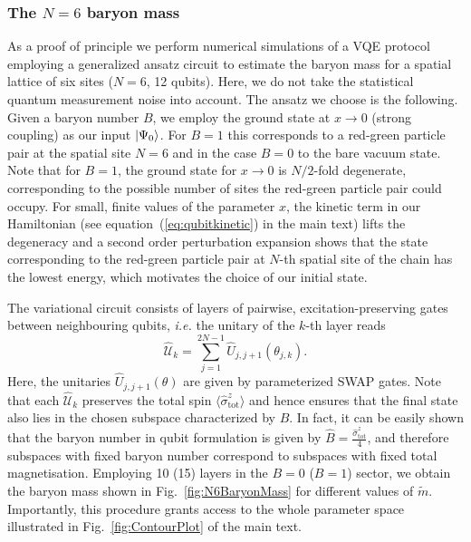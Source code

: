 \documentclass[twocolumn,aps,showpacs,prb,superscriptaddress,floatfix,10pt,nofootinbib]{revtex4-2}
\renewcommand{\eqref}[1]{equation~(\ref{#1})}
\begin{document}
\subsubsection{The \texorpdfstring{$N=6$}{N=6} baryon mass}
As a proof of principle we perform numerical simulations of a VQE protocol employing a generalized ansatz circuit to estimate the baryon mass for a spatial lattice of six sites ($N=6$, 12 qubits). Here, we do not take the statistical quantum measurement noise into account.
The ansatz we choose is the following. Given a baryon number $B$, we employ the ground state at $x\to0$ (strong coupling) as our input $\ket{\Psi_0}$. For $B=1$ this corresponds to a red-green particle pair at the spatial site $N=6$ and in the case $B=0$ to the bare vacuum state. 
Note that for $B=1$, the ground state for $x\to0$ is $N/2$-fold degenerate, corresponding to the possible number of sites the red-green particle pair could occupy. For small, finite values of the parameter $x$, the kinetic term in our Hamiltonian (see \eqref{eq:qubitkinetic} in the main text) lifts the degeneracy and a second order perturbation expansion shows that the state corresponding to the red-green particle pair at $N$-th spatial site of the chain has the lowest energy, which motivates the choice of our initial state. 

The variational circuit consists of layers of pairwise, excitation-preserving gates between neighbouring qubits, \textit{i.e.} the unitary of the $k$-th layer reads
\begin{equation}
\hat{\mathcal{U}}_k = \sum_{j=1}^{2N-1} \hat{U}_{j,j+1}(\theta_{j,k}).
\label{eq:N6VQEansatz}
\end{equation}
Here, the unitaries $\hat{U}_{j,j+1}(\theta)$ are given by parameterized SWAP gates.
Note that each $\hat{\mathcal{U}}_k$ preserves the total spin $\langle \hat{\sigma}_{\text{tot}}^z\rangle$ and hence ensures that the final state also lies in the chosen subspace characterized by $B$. In fact, it can be easily shown that the baryon number in qubit formulation is given by $ \hat{B} = \frac{\hat{\sigma}^z_{\text{tot}}}{4}$, and therefore subspaces with fixed baryon number correspond to subspaces with fixed total magnetisation.
Employing 10 (15) layers in the $B=0$ ($B=1$) sector, we obtain the baryon mass shown in Fig.~\ref{fig:N6BaryonMass} for different values of $\tilde{m}$. Importantly, this procedure grants access to the whole parameter space illustrated in Fig.~\ref{fig:ContourPlot} of the main text.
\newline
\end{document}
